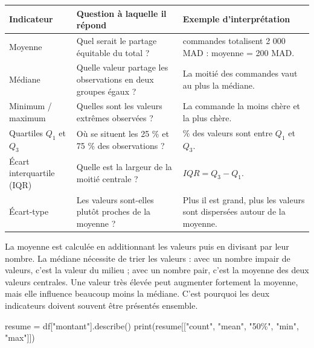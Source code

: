 \documentclass[
  french,
  letterpaper,
  open=any]{scrbook}
\newenvironment{Shaded}{\begin{snugshade}}{\end{snugshade}}
\newcommand{\BuiltInTok}[1]{\textcolor[rgb]{0.00,0.23,0.31}{#1}}
\newcommand{\NormalTok}[1]{\textcolor[rgb]{0.00,0.23,0.31}{#1}}
\newcommand{\OperatorTok}[1]{\textcolor[rgb]{0.37,0.37,0.37}{#1}}
\newcommand{\StringTok}[1]{\textcolor[rgb]{0.13,0.47,0.30}{#1}}
\newcounter{none} %
\theoremstyle{definition}
\theoremstyle{definition}
\theoremstyle{remark}
\begin{document}
{\def\LTcaptype{none} %
\begin{longtable}[]{@{}
  >{\raggedright\arraybackslash}p{}
  >{\raggedright\arraybackslash}p{}
  >{\raggedright\arraybackslash}p{}@{}}
\toprule\noalign{}
\begin{minipage}[b]{\linewidth}\raggedright
Indicateur
\end{minipage} & \begin{minipage}[b]{\linewidth}\raggedright
Question à laquelle il répond
\end{minipage} & \begin{minipage}[b]{\linewidth}\raggedright
Exemple d'interprétation
\end{minipage} \\
\midrule\noalign{}
\endhead
\bottomrule\noalign{}
\endlastfoot
Moyenne & Quel serait le partage équitable du total ? & 10 commandes
totalisent 2 000 MAD : moyenne = 200 MAD. \\
Médiane & Quelle valeur partage les observations en deux groupes égaux ?
& La moitié des commandes vaut au plus la médiane. \\
Minimum / maximum & Quelles sont les valeurs extrêmes observées ? & La
commande la moins chère et la plus chère. \\
Quartiles \(Q_1\) et \(Q_3\) & Où se situent les 25 \% et 75 \% des
observations ? & 50 \% des valeurs sont entre \(Q_1\) et \(Q_3\). \\
Écart interquartile (IQR) & Quelle est la largeur de la moitié centrale
? & \(IQR=Q_3-Q_1\). \\
Écart-type & Les valeurs sont-elles plutôt proches de la moyenne ? &
Plus il est grand, plus les valeurs sont dispersées autour de la
moyenne. \\
\end{longtable}
}

La moyenne est calculée en additionnant les valeurs puis en divisant par
leur nombre. La médiane nécessite de trier les valeurs : avec un nombre
impair de valeurs, c'est la valeur du milieu ; avec un nombre pair,
c'est la moyenne des deux valeurs centrales. Une valeur très élevée peut
augmenter fortement la moyenne, mais elle influence beaucoup moins la
médiane. C'est pourquoi les deux indicateurs doivent souvent être
présentés ensemble.

\begin{Shaded}
\begin{Highlighting}[]
\NormalTok{resume }\OperatorTok{=}\NormalTok{ df[}\StringTok{"montant"}\NormalTok{].describe()}
\BuiltInTok{print}\NormalTok{(resume[[}\StringTok{"count"}\NormalTok{, }\StringTok{"mean"}\NormalTok{, }\StringTok{"50\%"}\NormalTok{, }\StringTok{"min"}\NormalTok{, }\StringTok{"max"}\NormalTok{]])}
\end{Highlighting}
\end{Shaded}
\end{document}
